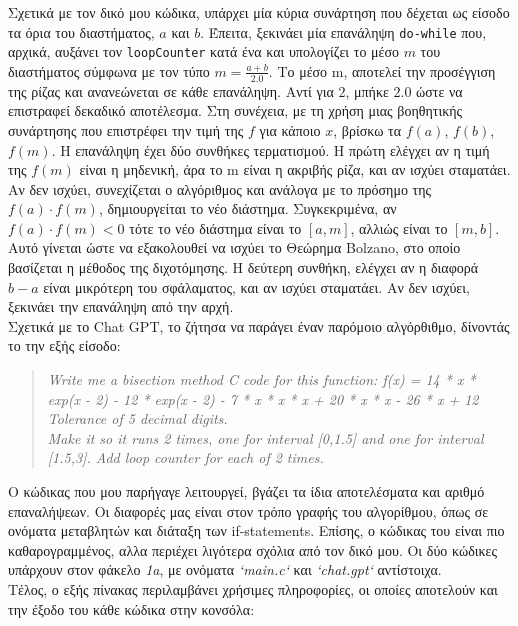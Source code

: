 \documentclass[a4paper, 14pt]{article}   %
\begin{document}
Σχετικά με τον δικό μου κώδικα, υπάρχει μία κύρια συνάρτηση που δέχεται ως είσοδο τα όρια του διαστήματος, \(a\) και \(b\). Έπειτα, ξεκινάει μία επανάληψη \texttt{do-while} που, αρχικά, αυξάνει τον \texttt{loopCounter} κατά ένα και υπολογίζει το μέσο \(m\) του διαστήματος σύμφωνα με τον τύπο \(m = \frac{a+b}{2.0}\). Το μέσο m, αποτελεί την προσέγγιση της ρίζας και ανανεώνεται σε κάθε επανάληψη. Αντί για \(2\), μπήκε \(2.0\) ώστε να επιστραφεί δεκαδικό αποτέλεσμα. Στη συνέχεια, με τη χρήση μιας βοηθητικής συνάρτησης που επιστρέφει την τιμή της \(f\) για κάποιο \(x\), βρίσκω τα \(f(a)\), \(f(b)\), \(f(m)\). Η επανάληψη έχει δύο συνθήκες τερματισμού. Η πρώτη ελέγχει αν η τιμή της \(f(m)\) είναι η μηδενική, άρα το m είναι η ακριβής ρίζα, και αν ισχύει σταματάει. Αν δεν ισχύει, συνεχίζεται ο αλγόριθμος και ανάλογα με το πρόσημο της \(f(a) \cdot f(m)\), δημιουργείται το νέο διάστημα. Συγκεκριμένα, αν \(f(a) \cdot f(m) < 0\) τότε το νέο διάστημα είναι το \([a,m]\), αλλιώς είναι το \([m,b]\). Αυτό γίνεται ώστε να εξακολουθεί να ισχύει το Θεώρημα Bolzano, στο οποίο βασίζεται η μέθοδος της διχοτόμησης. Η δεύτερη συνθήκη, ελέγχει αν η διαφορά \(b-a\) είναι μικρότερη του σφάλαματος, και αν ισχύει σταματάει. Αν δεν ισχύει, ξεκινάει την επανάληψη από την αρχή.\\

Σχετικά με το Chat GPT, το ζήτησα να παράγει έναν παρόμοιο αλγόρθιθμο, δίνοντάς το την εξής είσοδο:
	\begin{quote}
	{\small \emph{Write me a bisection method C code for this function: f(x) = 14 * x * exp(x - 2) - 12 * exp(x - 2) - 7 * x * x * x + 20 * x * x - 26 * x + 12\\
Tolerance of 5 decimal digits.\\
Make it so it runs 2 times, one for interval [0,1.5] and one for interval [1.5,3]. Add loop counter for each of 2 times.}}
	\end{quote}
Ο κώδικας που μου παρήγαγε λειτουργεί, βγάζει τα ίδια αποτελέσματα και αριθμό επαναλήψεων. Οι διαφορές μας είναι στον τρόπο γραφής του αλγορίθμου, όπως σε ονόματα μεταβλητών και διάταξη των if-statements. Επίσης, ο κώδικας του είναι πιο καθαρογραμμένος, αλλα περιέχει λιγότερα σχόλια από τον δικό μου. Οι δύο κώδικες υπάρχουν στον φάκελο \emph{1a}, με ονόματα \emph{`main.c`} και \emph{`chat.gpt`} αντίστοιχα.\\

Τέλος, ο εξής πίνακας περιλαμβάνει χρήσιμες πληροφορίες, οι οποίες αποτελούν και την έξοδο του κάθε κώδικα στην κονσόλα:\\
\end{document}
